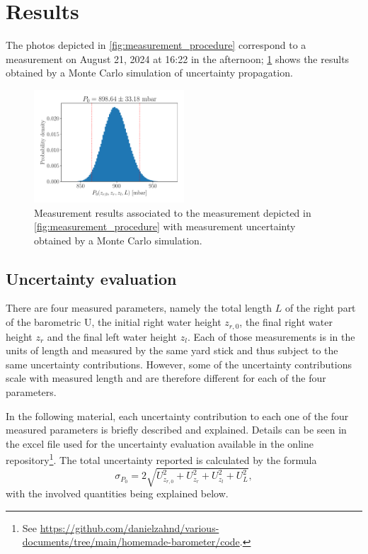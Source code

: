 \documentclass[a4paper,11pt, twocolumn]{article}
\begin{document}
\section{Results}
The photos depicted in \cref{fig:measurement_procedure} correspond to a measurement on August 21, 2024 at 16:22 in the afternoon; \cref{fig:result_mc} shows the results obtained by a Monte Carlo simulation of uncertainty propagation.
\begin{figure}[h]
	\centering
	\includegraphics[width=0.5\textwidth]{figures/result_mc.pdf}
	\caption{Measurement results associated to the measurement depicted in \cref{fig:measurement_procedure} with measurement uncertainty obtained by a Monte Carlo simulation.}
	\label{fig:result_mc}
\end{figure}

\subsection{Uncertainty evaluation}
There are four measured parameters, namely the total length $L$ of the right part of the barometric U, the initial right water height $z_{r,0}$, the final right water height $z_r$ and the final left water height $z_l$. Each of those measurements is in the units of length and measured by the same yard stick and thus subject to the same uncertainty contributions. However, some of the uncertainty contributions scale with measured length and are therefore different for each of the four parameters.

In the following material, each uncertainty contribution to each one of the four measured parameters is briefly described and explained. Details can be seen in the excel file used for the uncertainty evaluation available in the online repository\footnote{See \url{https://github.com/danielzahnd/various-documents/tree/main/homemade-barometer/code}.}. The total uncertainty reported is calculated by the formula \begin{equation}
	\sigma_{P_0} = 2\sqrt{U_{z_{r,0}}^2 + U_{z_r}^2 + U_{z_l}^2 + U_L^2},
\end{equation} with the involved quantities being explained below.
\end{document}
